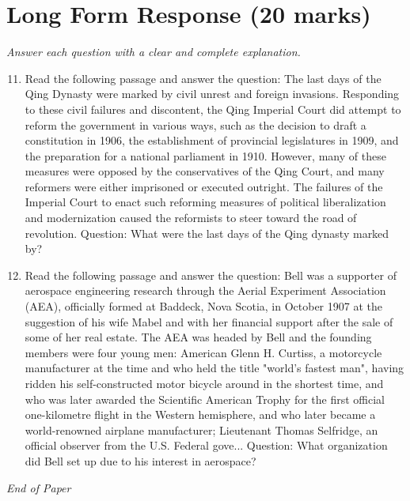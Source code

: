 \documentclass[12pt]{article}
\begin{document}
\section*{Long Form Response (20 marks)}
\textit{Answer each question with a clear and complete explanation.}
\begin{enumerate}[label=\arabic*.]
\setcounter{enumi}{10}
\item Read the following passage and answer the question: The last days of the Qing Dynasty were marked by civil unrest and foreign invasions. Responding to these civil failures and discontent, the Qing Imperial Court did attempt to reform the government in various ways, such as the decision to draft a constitution in 1906, the establishment of provincial legislatures in 1909, and the preparation for a national parliament in 1910. However, many of these measures were opposed by the conservatives of the Qing Court, and many reformers were either imprisoned or executed outright. The failures of the Imperial Court to enact such reforming measures of political liberalization and modernization caused the reformists to steer toward the road of revolution. Question: What were the last days of the Qing dynasty marked by?
\item Read the following passage and answer the question: Bell was a supporter of aerospace engineering research through the Aerial Experiment Association (AEA), officially formed at Baddeck, Nova Scotia, in October 1907 at the suggestion of his wife Mabel and with her financial support after the sale of some of her real estate. The AEA was headed by Bell and the founding members were four young men: American Glenn H. Curtiss, a motorcycle manufacturer at the time and who held the title "world's fastest man", having ridden his self-constructed motor bicycle around in the shortest time, and who was later awarded the Scientific American Trophy for the first official one-kilometre flight in the Western hemisphere, and who later became a world-renowned airplane manufacturer; Lieutenant Thomas Selfridge, an official observer from the U.S. Federal gove... Question: What organization did Bell set up due to his interest in aerospace?
\end{enumerate}

\vfill
\noindent\textit{End of Paper}
\end{document}
